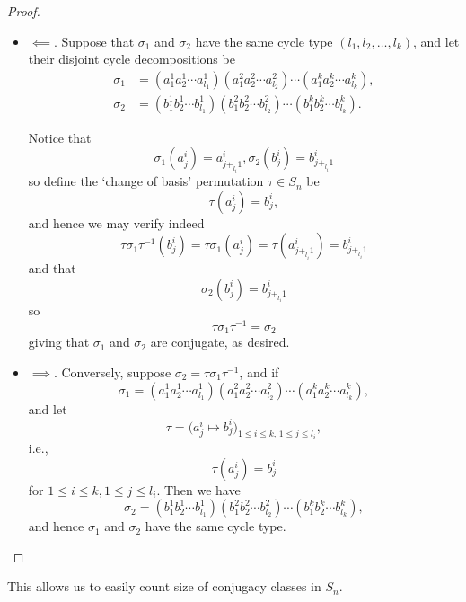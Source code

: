 \documentclass{article}
\theoremstyle{definition}
\theoremstyle{remark}
\newcommand{\pqty}[1]{\left(#1\right)}
\newcommand{\perm}[1]{(#1)}
\newcommand{\inverse}{^{-1}}
\begin{document}
\begin{proof}
    \begin{itemize}
        \item \(\impliedby\). Suppose that \(\sigma_1\) and \(\sigma_2\) have the same cycle type \(\pqty{l_1, l_2, \ldots, l_k}\), and let their disjoint cycle decompositions be
        \begin{align*}
            \sigma_1 &= \perm{{a_1^1} {a_2^1} \cdots {a_{l_1}^1}} \perm{{a_1^2} {a_2^2} \cdots {a_{l_2}^2}} \cdots \perm{{a_1^k} {a_2^k} \cdots {a_{l_k}^k}}, \\
            \sigma_2 &= \perm{{b_1^1} {b_2^1} \cdots {b_{l_1}^1}} \perm{{b_1^2} {b_2^2} \cdots {b_{l_2}^2}} \cdots \perm{{b_1^k} {b_2^k} \cdots {b_{l_k}^k}}.
        \end{align*}

        Notice that
        \[
            \sigma_1 \pqty{a_j^i} = a_{j +_{l_i} 1}^i, \sigma_2 \pqty{b_j^i} = b_{j +_{l_i} 1}^i
        \]
        so define the `change of basis' permutation \(\tau \in S_n\) be
        \[
            \tau \pqty{a_j^i} = b_j^i,
        \]
        and hence we may verify indeed
        \[
            \tau\sigma_1\tau\inverse \pqty{b_j^i} = \tau\sigma_1\pqty{a_j^i} = \tau\pqty{a_{j +_{l_i} 1}^{i}} = b_{j +_{l_i} 1}^i
        \]
        and that
        \[
            \sigma_2\pqty{b_j^i} = b_{j +_{l_i} 1}^i
        \]
        so
        \[
            \tau \sigma_1 \tau\inverse = \sigma_2
        \]
        giving that \(\sigma_1\) and \(\sigma_2\) are conjugate, as desired.

        \item \(\implies\). Conversely, suppose \(\sigma_2 = \tau \sigma_1 \tau\inverse\), and if
        \[
            \sigma_1 = \perm{{a_1^1} {a_2^1} \cdots {a_{l_1}^1}} \perm{{a_1^2} {a_2^2} \cdots {a_{l_2}^2}} \cdots \perm{{a_1^k} {a_2^k} \cdots {a_{l_k}^k}},
        \]
        and let
        \[
            \tau = \bigl(a_j^i\mapsto b_j^i\bigr)_{1\leq i\leq k,\,1\leq j\leq l_i},
        \]
        i.e.,
        \[
            \tau\pqty{a_j^i} = b_j^i
        \]
        for \(1 \leq i \leq k, 1 \leq j \leq l_i\). Then we have
        \[
            \sigma_2 = \perm{{b_1^1} {b_2^1} \cdots {b_{l_1}^1}} \perm{{b_1^2} {b_2^2} \cdots {b_{l_2}^2}} \cdots \perm{{b_1^k} {b_2^k} \cdots {b_{l_k}^k}},
        \]
        and hence \(\sigma_1\) and \(\sigma_2\) have the same cycle type.
    \end{itemize}
\end{proof}

This allows us to easily count size of conjugacy classes in \(S_n\).
\end{document}

